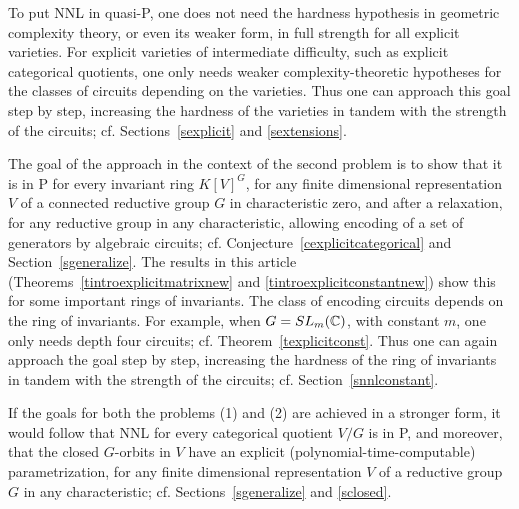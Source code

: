 \documentclass[11pt]{article}
\begin{document}
To put NNL in quasi-P, one does not need the hardness   hypothesis in geometric complexity theory,
or even its weaker form, in full strength  for all explicit varieties.
For explicit varieties of intermediate difficulty, such as explicit 
categorical quotients,  one only needs 
weaker  complexity-theoretic hypotheses for  the classes of circuits depending on the varieties.
Thus one can  approach this   goal  step by step,
increasing the hardness   of the varieties  in tandem 
with the strength of the circuits; cf. Sections~\ref{sexplicit} and \ref{sextensions}.

The  goal  of the approach  in the context of   the second  problem  is to show that it  is  in P 
for every  invariant ring $K[V]^G$, for  any finite dimensional representation $V$
of a connected reductive group $G$ in characteristic zero, and after a relaxation, for any reductive group 
in any characteristic,  allowing  encoding of a  set of generators by 
algebraic circuits;  cf. Conjecture~\ref{cexplicitcategorical} and  Section~\ref{sgeneralize}.  
The results in this article (Theorems~\ref{tintroexplicitmatrixnew} and \ref{tintroexplicitconstantnew}) 
show this for  some important rings of invariants.
The class of encoding circuits depends on the ring of invariants. 
For example, when $G=SL_m(\mathbb{C})$, with constant $m$, one only needs  depth four
circuits; cf. Theorem~\ref{texplicitconst}.
Thus one can again approach the  goal  step by step, increasing the hardness   of the ring of invariants in tandem 
with the strength of the  circuits; cf. Section~\ref{snnlconstant}.

If  the goals  for both the problems (1) and (2) are achieved in a  stronger  form, it would follow
that NNL for every categorical quotient $V/G$ is in P, and  moreover, 
that the closed $G$-orbits in $V$
have an explicit (polynomial-time-computable) parametrization,
for any finite dimensional representation $V$ of a  reductive group $G$ in 
any characteristic;  cf. Sections~\ref{sgeneralize} and \ref{sclosed}.
\end{document}
